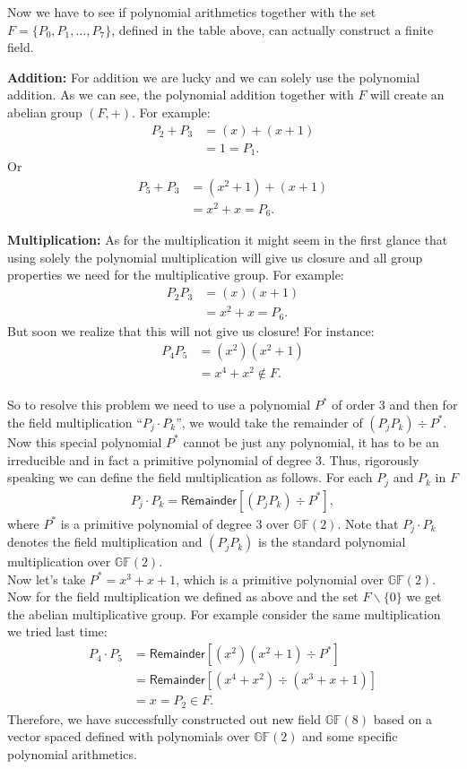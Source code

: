 \documentclass[12pt]{article}
\newcommand{\gf}[1]{\mathds{GF}\left(#1\right)} %
\begin{document}
Now we have to see if polynomial arithmetics together with the set $F = \{P_0 , P_1, \ldots , P_7\}$, defined in the table above, can actually construct a finite field. 
 
\textbf{Addition:} For addition we are lucky and we can solely use the polynomial addition. As we can see, the polynomial addition together with $F$ will create an abelian group $(F, +)$. For example: 
\begin{align*}
	P_2 + P_3 & = (x) + (x+1) \\
	& = 1 = P_1 .
\end{align*} Or
\begin{align*}
P_5 + P_3 & = (x^2 + 1) + (x+1) \\
& = x^2 + x = P_6 .
\end{align*}


\textbf{Multiplication:} As for the multiplication it might seem in the first glance that using solely the polynomial multiplication will give us closure and all group properties we need for the multiplicative group. For example:
\begin{align*}
P_2  P_3 & = (x) (x+1) \\
& = x^2 + x = P_6 .
\end{align*} But soon we realize that this will not give us closure! For instance:
\begin{align*}
P_4  P_5 & = (x^2)  (x^2+1) \\
& = x^4 + x^2 \notin F .
\end{align*}

So to resolve this problem we need to use a polynomial $P^{*}$ of order $3$ and then for the field multiplication ``$P_j \cdot P_k$'', we would take the remainder of $(P_j P_k)\div P^*$. Now this special polynomial $P^*$ cannot be just any polynomial, it has to be an irreducible and in fact a primitive polynomial of degree $3$. Thus, rigorously speaking we can define the field multiplication as follows. For each $P_j$ and $P_k$ in $F$
\begin{align*}
	P_j \cdot P_k = \mathsf{Remainder} \left[(P_j P_k)\div P^* \right] ,
\end{align*} 
where $P^*$ is a primitive polynomial of degree $3$ over $ 
\gf{2}. $ Note that $P_j \cdot P_k$ denotes the field multiplication and $(P_j P_k)$
is the standard polynomial multiplication over $\gf{2}$. \\

Now let's take $P^* = x^3 + x +1$, which is a primitive polynomial over $\gf{2}$. Now for the field multiplication we defined as above and the set $F\backslash\{0\}$ we get the abelian multiplicative group. For example consider the same multiplication we tried last time:
\begin{align*}
P_4 \cdot P_5 & =\mathsf{Remainder} \left[ (x^2)  (x^2+1) \div P^* \right]  \\
& = \mathsf{Remainder} \left[  (x^4 + x^2) \div (x^3 + x +1) \right] \\
& = x = P_2 \in F .
\end{align*} Therefore, we have successfully constructed out new field $\gf{8}$ based on a vector spaced defined with polynomials over $\gf{2}$ and some specific polynomial arithmetics. \\
\end{document}
